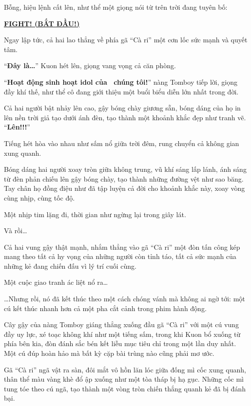 \documentclass[../main.tex]{subfiles}
\begin{document}

Bỗng, hiệu lệnh cất lên, như thể một giọng nói từ trên trời đang tuyên bố:

\begin{center}
  \uline{\textbf{FIGHT! (BẮT ĐẦU!)}}
\end{center}

Ngay lập tức, cả hai lao thẳng về phía gã ``Cà ri'' một cơn lốc sức mạnh và quyết tâm.

``\textbf{Đây là\dots}'' Kuon hét lên, giọng vang vọng cả căn phòng.

``\textbf{Hoạt động sinh hoạt idol của \hll\ chúng tôi!}'' nàng Tomboy tiếp lời, giọng đầy khí thế, như thể cô đang giới thiệu một buổi biểu diễn lớn nhất trong đời.

Cả hai người bật nhảy lên cao, gậy bóng chày giương sẵn, bóng dáng của họ in lên nền trời giả tạo dưới ánh đèn, tạo thành một khoảnh khắc đẹp như tranh vẽ. ``\textbf{Lên!!!}''

Tiếng hét hòa vào nhau như sấm nổ giữa trời đêm, rung chuyển cả không gian xung quanh.

Bóng dáng hai người xoay tròn giữa không trung, vũ khí sáng lấp lánh, ánh sáng từ đèn phản chiếu lên gậy bóng chày, tạo thành những đường vệt như sao băng. Tay chân họ đồng điệu như đã tập luyện cả đời cho khoảnh khắc này, xoay vòng cùng nhịp, cùng tốc độ.

Một nhịp tim lặng đi, thời gian như ngừng lại trong giây lát.

Và rồi\dots

Cả hai vung gậy thật mạnh, nhắm thẳng vào gã ``Cà ri'' một đòn tấn công kép mang theo tất cả hy vọng của những người còn tỉnh táo, tất cả sức mạnh của những kẻ đang chiến đấu vì lý trí cuối cùng.

Một cuộc giao tranh ác liệt nổ ra\dots

\omk

\dots Nhưng rồi, nó đã kết thúc theo một cách chóng vánh mà không ai ngờ tới: một cú kết thúc nhanh hơn cả một pha cắt cảnh trong phim hành động.

Cây gậy của nàng Tomboy giáng thẳng xuống đầu gã ``Cà ri'' với một cú vung đầy uy lực, xé toạc không khí như một tiếng sấm, trong khi Kuon bổ xuống từ phía bên kia, đòn đánh sắc bén kết liễu mục tiêu chỉ trong một lần duy nhất. Một cú đúp hoàn hảo mà bất kỳ cặp bài trùng nào cũng phải mơ ước.

Gã ``Cà ri'' ngã vật ra sàn, đôi mắt vô hồn lăn lóc giữa đống mì cốc xung quanh, thân thể màu vàng khè đổ ập xuống như một tòa tháp bị hạ gục. Những cốc mì tung tóe theo cú ngã, tạo thành một vòng tròn chiến thắng quanh kẻ đã bị đánh bại.
\end{document}
